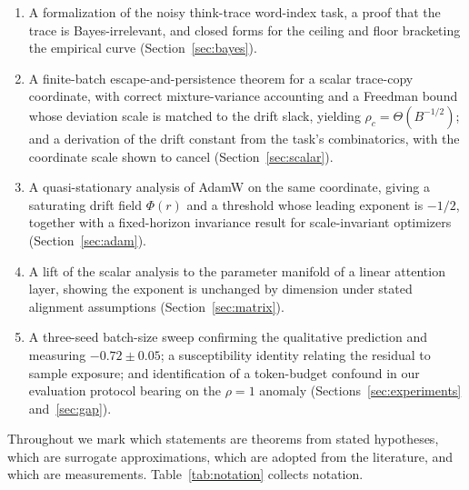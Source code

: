 \documentclass{article}
\theoremstyle{plain}
\theoremstyle{definition}
\theoremstyle{remark}
\newcommand{\1}{\mathbf{1}}
\begin{document}
\begin{enumerate}[leftmargin=*,itemsep=2pt]
\item A formalization of the noisy think-trace word-index task, a proof that the
trace is Bayes-irrelevant, and closed forms for the ceiling and floor bracketing
the empirical curve (Section~\ref{sec:bayes}).
\item A finite-batch escape-and-persistence theorem for a scalar trace-copy
coordinate, with correct mixture-variance accounting and a Freedman bound whose
deviation scale is matched to the drift slack, yielding
$\rho_c = \Theta(B^{-1/2})$; and a derivation of the drift constant from the
task's combinatorics, with the coordinate scale shown to cancel
(Section~\ref{sec:scalar}).
\item A quasi-stationary analysis of AdamW on the same coordinate, giving a
saturating drift field $\Phi(r)$ and a threshold whose leading exponent is
$-1/2$, together with a fixed-horizon invariance result for scale-invariant
optimizers (Section~\ref{sec:adam}).
\item A lift of the scalar analysis to the parameter manifold of a linear
attention layer, showing the exponent is unchanged by dimension under stated
alignment assumptions (Section~\ref{sec:matrix}).
\item A three-seed batch-size sweep confirming the qualitative prediction and
measuring $-0.72\pm0.05$; a susceptibility identity relating the residual to
sample exposure; and identification of a token-budget confound in our evaluation
protocol bearing on the $\rho=1$ anomaly (Sections~\ref{sec:experiments}
and~\ref{sec:gap}).
\end{enumerate}

Throughout we mark which statements are theorems from stated hypotheses, which
are surrogate approximations, which are adopted from the literature, and which
are measurements. Table~\ref{tab:notation} collects notation.
\end{document}
